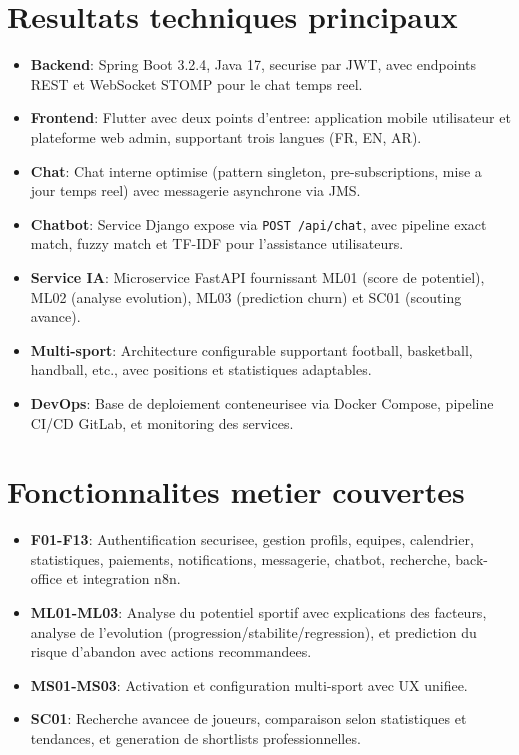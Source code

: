 \section{Resultats techniques principaux}

\begin{itemize}
  \item \textbf{Backend}: Spring Boot 3.2.4, Java 17, securise par JWT, avec endpoints REST et WebSocket STOMP pour le chat temps reel.
  \item \textbf{Frontend}: Flutter avec deux points d'entree: application mobile utilisateur et plateforme web admin, supportant trois langues (FR, EN, AR).
  \item \textbf{Chat}: Chat interne optimise (pattern singleton, pre-subscriptions, mise a jour temps reel) avec messagerie asynchrone via JMS.
  \item \textbf{Chatbot}: Service Django expose via \texttt{POST /api/chat}, avec pipeline exact match, fuzzy match et TF-IDF pour l'assistance utilisateurs.
  \item \textbf{Service IA}: Microservice FastAPI fournissant ML01 (score de potentiel), ML02 (analyse evolution), ML03 (prediction churn) et SC01 (scouting avance).
  \item \textbf{Multi-sport}: Architecture configurable supportant football, basketball, handball, etc., avec positions et statistiques adaptables.
  \item \textbf{DevOps}: Base de deploiement conteneurisee via Docker Compose, pipeline CI/CD GitLab, et monitoring des services.
\end{itemize}

\section{Fonctionnalites metier couvertes}

\begin{itemize}
  \item \textbf{F01-F13}: Authentification securisee, gestion profils, equipes, calendrier, statistiques, paiements, notifications, messagerie, chatbot, recherche, back-office et integration n8n.
  \item \textbf{ML01-ML03}: Analyse du potentiel sportif avec explications des facteurs, analyse de l'evolution (progression/stabilite/regression), et prediction du risque d'abandon avec actions recommandees.
  \item \textbf{MS01-MS03}: Activation et configuration multi-sport avec UX unifiee.
  \item \textbf{SC01}: Recherche avancee de joueurs, comparaison selon statistiques et tendances, et generation de shortlists professionnelles.
\end{itemize}

